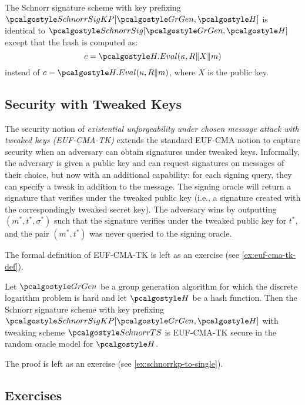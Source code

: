 \begin{definition}\label{def:schnorr-kp}
  The Schnorr signature scheme with key prefixing $\algo{SchnorrSigKP}[\grgen, \algo{H}]$ is identical to $\algo{SchnorrSig}[\grgen, \algo{H}]$ except that the hash is computed as:
  \[
    c = \algo{H.Eval}(\kappa, R \| X \| m)
  \]
  instead of $c = \algo{H.Eval}(\kappa, R \| m)$, where $X$ is the public key.
\end{definition}

\subsection{Security with Tweaked Keys}

The security notion of \emph{existential unforgeability under chosen message attack with tweaked keys (EUF-CMA-TK)} extends the standard EUF-CMA notion to capture security when an adversary can obtain signatures under tweaked keys.
Informally, the adversary is given a public key and can request signatures on messages of their choice, but now with an additional capability: for each signing query, they can specify a tweak in addition to the message.
The signing oracle will return a signature that verifies under the tweaked public key (i.e., a signature created with the correspondingly tweaked secret key).
The adversary wins by outputting $(m^*, t^*, \sigma^*)$ such that the signature verifies under the tweaked public key for $t^*$, and the pair $(m^*, t^*)$ was never queried to the signing oracle.

The formal definition of EUF-CMA-TK is left as an exercise (see \autoref{ex:euf-cma-tk-def}).

\begin{theorem}\label{thm:schnorrkp-euf-cma-tk}
  Let $\grgen$ be a group generation algorithm for which the discrete logarithm problem is hard and let $\algo{H}$ be a hash function.
  Then the Schnorr signature scheme with key prefixing $\algo{SchnorrSigKP}[\grgen, \algo{H}]$ with tweaking scheme $\algo{SchnorrTS}$ is EUF-CMA-TK secure in the random oracle model for $\algo{H}$.
\end{theorem}

The proof is left as an exercise (see \autoref{ex:schnorrkp-to-single}).

\subsection{Exercises}

